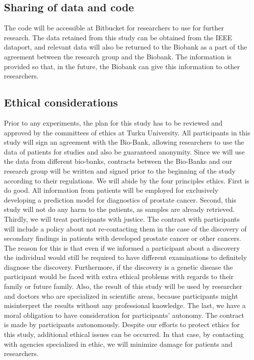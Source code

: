 \documentclass[11pt]{article}
\begin{document}
\subsection{Sharing of data and code}
The code will be accessible at Bitbucket for researchers to use for further research. The data retained from this study can be obtained from the IEEE dataport, and relevant data will also be returned to the Biobank as a part of the agreement between the research group and the Biobank. The information is provided so that, in the future, the Biobank can give this information to other researchers. 
\vspace{3mm}

\subsection{Ethical considerations}
Prior to any experiments, the plan for this study has to be reviewed and approved by the committees of ethics at Turku University. All participants in this study will sign an agreement with the Bio-Bank, allowing researchers to use the data of patients for studies and also be guaranteed anonymity. Since we will use the data from different bio-banks, contracts between the Bio-Banks and our research group will be written and signed prior to the beginning of the study according to their regulations. 
We will abide by the four principles ethics.
\newline 
First is do good.  All information from patients will be employed for exclusively developing a prediction model for diagnostics of prostate cancer. Second, this study will not do any harm to the patients, as samples are already retrieved. Thirdly, we will treat participants with justice. The contract with participants will include a policy about not re-contacting them in the case of the discovery of secondary findings in patients with developed prostate cancer or other cancers. The reason for this is that even if we informed a participant about a discovery the individual would still be required to have different examinations to definitely diagnose the discovery. Furthermore, if the discovery is a genetic disease the participant would be faced with extra ethical problems with regards to their family or future family. Also, the result of this study will be used by researcher and doctors who are specialized in scientific areas, because participants might misinterpret the results without any professional knowledge. 
The last, we have a moral obligation to have consideration for participants’ autonomy. The contract is made by participants autonomously.
\newline
Despite our efforts to protect ethics for this study, additional ethical issues can be occurred. In that case, by contacting with agencies specialized in ethic, we will minimize damage for patients and researchers.
\end{document}
